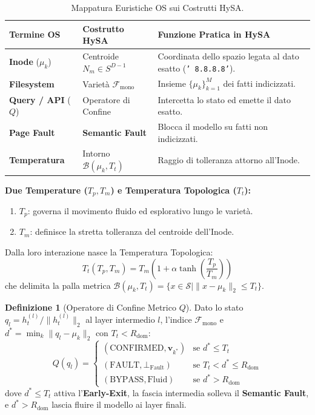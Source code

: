 \documentclass[10pt,twocolumn]{article}
\theoremstyle{definition}
\newtheorem{definizione}{Definizione}
\begin{document}
\begin{table}[t]
\centering
\caption{Mappatura Euristiche OS sui Costrutti HySA.}
\label{tab:terminology}
\vspace{0.10cm}
\scriptsize
\setlength{\tabcolsep}{2.0pt}
\begin{tabular}{@{}p{1.9cm}p{2.2cm}p{3.9cm}@{}}
\toprule
\textbf{Termine OS} & \textbf{Costrutto HySA} & \textbf{Funzione Pratica in HySA} \\ \midrule
\textbf{Inode} ($\mu_k$) & Centroide $N_m \in S^{D-1}$ & Coordinata dello spazio legata al dato esatto (\texttt{' 8.8.8.8'}). \\[2pt]
\textbf{Filesystem} & Varietà $\mathcal{F}_{\mathrm{mono}}$ & Insieme $\{\mu_k\}_{k=1}^M$ dei fatti indicizzati. \\[2pt]
\textbf{Query / API} ($Q$) & Operatore di Confine & Intercetta lo stato ed emette il dato esatto. \\[2pt]
\textbf{Page Fault} & \textbf{Semantic Fault} & Blocca il modello su fatti non indicizzati. \\[2pt]
\textbf{Temperatura} & Intorno $\mathcal{B}(\mu_k, T_t)$ & Raggio di tolleranza attorno all'Inode. \\ \bottomrule
\end{tabular}
\end{table}

\textbf{Due Temperature ($T_p, T_m$) e Temperatura Topologica ($T_t$):}
\begin{enumerate}[leftmargin=*, itemsep=1.0pt]
    \item $T_p$: governa il movimento fluido ed esplorativo lungo le varietà.
    \item $T_m$: definisce la stretta tolleranza del centroide dell'Inode.
\end{enumerate}
Dalla loro interazione nasce la Temperatura Topologica:
\begin{equation}
    T_t(T_p, T_m) = T_m \left( 1 + \alpha \tanh\left( \frac{T_p}{T_m} \right) \right)
\end{equation}
che delimita la palla metrica $\mathcal{B}(\mu_k, T_t) = \{x \in \mathcal{S} \mid \|x - \mu_k\|_2 \le T_t\}$.

\begin{definizione}[Operatore di Confine Metrico $Q$]
{\small
Dato lo stato $q_l = h_t^{(l)} / \|h_t^{(l)}\|_2$ al layer intermedio $l$, l'indice $\mathcal{F}_{\mathrm{mono}}$ e $d^* = \min_k \|q_l - \mu_k\|_2$ con $T_t < R_{\mathrm{dom}}$:
\begin{equation}
    Q(q_l) = 
    \begin{cases} 
      (\mathrm{CONFIRMED}, \mathbf{v}_{k^*}) & \text{se } d^* \le T_t \\ 
      (\mathrm{FAULT}, \bot_{\mathrm{Fault}}) & \text{se } T_t < d^* \le R_{\mathrm{dom}} \\
      (\mathrm{BYPASS}, \mathrm{Fluid}) & \text{se } d^* > R_{\mathrm{dom}}
    \end{cases}
\end{equation}
dove $d^* \le T_t$ attiva l'\textbf{Early-Exit}, la fascia intermedia solleva il \textbf{Semantic Fault}, e $d^* > R_{\mathrm{dom}}$ lascia fluire il modello ai layer finali.
}
\end{definizione}
\end{document}
